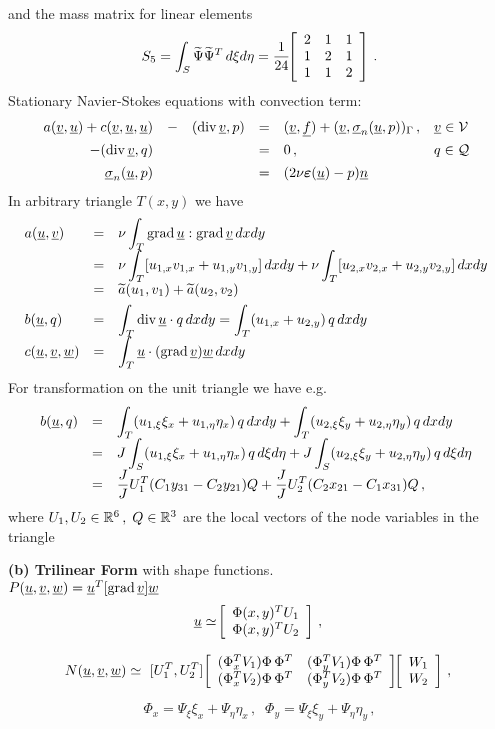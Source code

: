 \documentclass[12pt,a4paper,USenglish,twoside]{book}
\begin{document}
and the mass matrix for linear elements
\[
S_5 = \int_S\wi{\Psi}\wi{\Psi}^T\, d\xi d\eta =
\frac{1}{24}\,\ba{[}{ccc} 2 & 1 & 1\\ 1 & 2 & 1\\1 & 1 & 2\ea{]}\,.
\]
Stationary {\sc Navier-Stokes} equations with convection term:
\[
\ba{.}{rclcll}
a(\v,\u) + c(\v,\u,\u) &-&(\div \v,p) &=& (\v,\f)
+ (\v,\ul{\sigma}_n(\u,p))_{\Gamma}\,, &\v \in \V \\[1ex]
-(\div \v,q) && &=& 0\,,     & q \in \Q\\[1ex]
\ul{\sigma}_n(\u,p) && &=& (2\nu \eps(\u) - p)\n
\ea{.}
\]
In arbitrary triangle $T(x,y)$ we have
\[
\ba{.}{lll}
a(\u,\v) &=& \nu \dis \int_T\grad \u :\grad \v \, dxdy\\[1ex]
&=& \dis \nu \int_T[u_{1,x}v_{1,x} + u_{1,y}v_{1,y}]\, dxdy
+ \nu \int_T[u_{2,x}v_{2,x} + u_{2,y}v_{2,y}]\, dxdy\\[1ex]
&=& \wi{a}(u_1,v_1) + \wi{a}(u_2,v_2)\\[1ex]
b(\u,q) &=& \dis \int_T\div \u \cdot q\, dxdy
= \int_T(u_{1,x} + u_{2,y})\,q \, dxdy\\[1ex]
c(\u,\v,\w) &=& \dis \int_T\u \cdot (\grad \v)\w\, dxdy
\ea{.}
\]
For transformation on the unit triangle we have e.g.
\[
\ba{.}{lll}
b(\u,q)
&=& \dis
\int_T(u_{1,\xi}\xi_x + u_{1,\eta}\eta_x)\,q\,dxdy
+ \int_T(u_{2,\xi}\xi_y + u_{2,\eta}\eta_y)\,q\,dxdy\\[1ex]
&=& \dis
J \int_S(u_{1,\xi}\xi_x + u_{1,\eta}\eta_x)\,q\,d\xi d\eta
+ J \int_S(u_{2,\xi}\xi_y + u_{2,\eta}\eta_y)\,q\,d\xi d\eta\\[1ex]
&=& \dis
\frac{J}{J}U_1^T(C_1y_{31} - C_2y_{21})Q
+ \frac{J}{J}U_2^T(C_2 x_{21} -C_1x_{31})Q\,,
\ea{.}
\]
where $U_1,U_2 \in \mb{R}^6\,,\; Q \in \mb{R}^3$ are the local vectors of the node
variables in the triangle
\par
{\bf (b) Trilinear Form} with shape functions.\\
$
P(\u,\v,\w) = \u^T[\grad \v]\w
$
\[
\u \simeq \ \ba{[}{r}\Phi(x,y)^TU_1\\ \Phi(x,y)^TU_2\ea{]}\,,\;
\]
\par\vspace{1ex}
\[
N(\u,\v,\w) \simeq \
[U^T_1,U^T_2]\ \ba{[}{cc}
(\Phi_x^TV_1)\Phi\,\Phi^T &
(\Phi_y^TV_1)\Phi\,\Phi^T \\
(\Phi_x^TV_2)\Phi\,\Phi^T &
(\Phi_y^TV_2)\Phi\,\Phi^T \ea{]}\,
\ba{[}{r}W_1\\ W_2\ea{]}\,,\;
\]
\par
\[
\Phi_x = \Psi_{\xi}\xi_x + \Psi_{\eta}\eta_x\,,\;\;
\Phi_y = \Psi_{\xi}\xi_y + \Psi_{\eta}\eta_y\,,
\]
\end{document}
